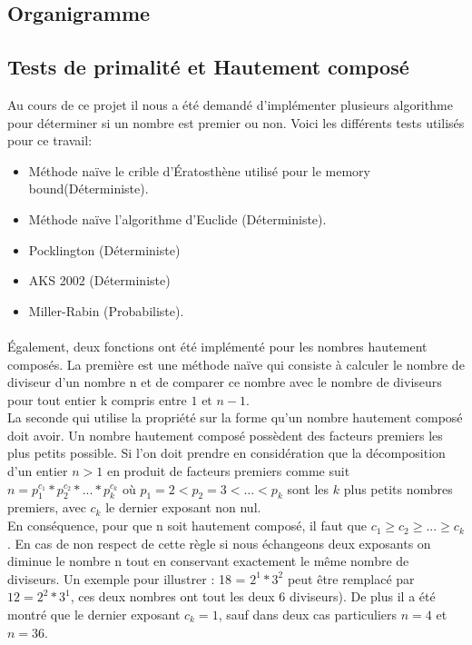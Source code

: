 		\subsection{Organigramme}
		\subsection{Tests de primalité et Hautement composé}
		Au cours de ce projet il nous a été demandé d'implémenter plusieurs algorithme pour déterminer si un nombre est premier ou non. Voici les différents tests utilisés pour ce travail:
		\begin{itemize}
			\item Méthode naïve le crible d’Ératosthène utilisé pour le memory bound(Déterministe).
			\item Méthode naïve l'algorithme d'Euclide (Déterministe).
			\item Pocklington (Déterministe)
			\item AKS 2002 (Déterministe)
			\item Miller-Rabin (Probabiliste).
		\end{itemize}
		
		\paragraph{} Également, deux fonctions ont été implémenté pour les nombres hautement composés. La première est une méthode naïve qui consiste à calculer le nombre de diviseur d'un nombre n et de comparer ce nombre avec le nombre de diviseurs pour tout entier k compris entre $1$ et $n-1$.\\
		La seconde qui utilise la propriété sur la forme qu'un nombre hautement composé doit avoir. Un nombre hautement composé possèdent des facteurs premiers les plus petits possible. Si l'on doit prendre en considération que la décomposition d'un entier $n > 1$ en produit de facteurs premiers comme suit  $n = p_1^{c_1} * p_2^{c_2} * ... * p_k^{c_k}$ où $p_1 = 2 < p_2 = 3 < … < p_k$ sont les $k$ plus petits nombres premiers, avec $c_k$ le dernier exposant non nul.\\
		En conséquence, pour que n soit hautement composé, il faut que $c_1 \ge c_2 \ge ... \ge c_k$. En cas de non respect de cette règle si nous échangeons deux exposants on diminue le nombre n tout en conservant exactement le même nombre de diviseurs. Un exemple pour illustrer : 18 = $2^1 * 3^2$ peut être remplacé par $12 = 2^2 * 3^1$, ces deux nombres ont tout les deux 6 diviseurs). De plus il a été montré que le dernier exposant $c_k = 1$, sauf dans deux cas particuliers $n = 4$ et $n = 36$.


